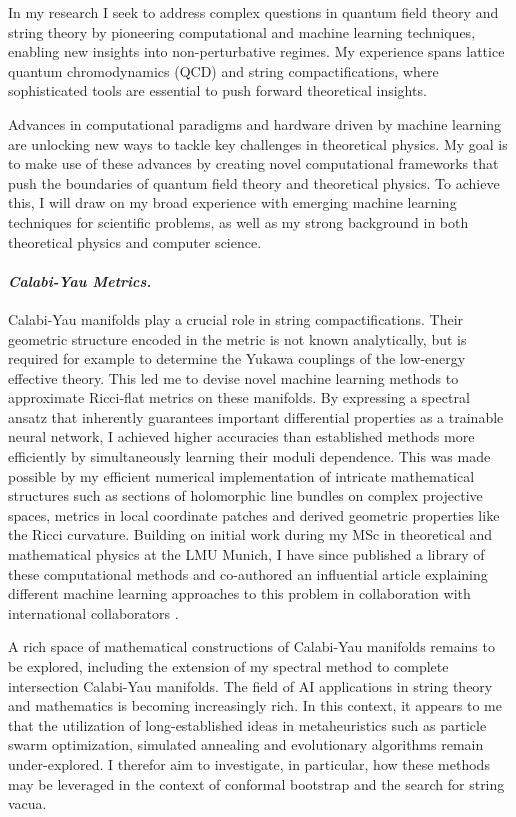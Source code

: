 \documentclass[11pt]{article}
\title{}
\author{}
\date{}
\begin{document}
\thispagestyle{firstpagestyle}


In my research I seek to address complex questions in quantum field theory and string theory by pioneering computational and machine learning techniques, enabling new insights into non-perturbative regimes.
My experience spans lattice quantum chromodynamics (QCD) and string compactifications, where sophisticated tools are essential to push forward theoretical insights.

Advances in computational paradigms and hardware driven by machine learning are unlocking new
ways to tackle key challenges in theoretical physics. My goal is to make use of these advances by creating novel computational
frameworks that push the boundaries of quantum field theory and theoretical physics. To achieve
this, I will draw on my broad experience with emerging machine learning techniques for scientific
problems, as well as my strong background in both theoretical physics and computer science.


\paragraph{\textit{{Calabi-Yau Metrics.}}}
Calabi-Yau manifolds play a crucial role in string compactifications.
Their geometric structure encoded in the metric is not known analytically, but is required for example to determine the Yukawa couplings of the low-energy effective theory.
This led me to devise novel machine learning methods to approximate Ricci-flat metrics on these manifolds.
By expressing a spectral ansatz that inherently guarantees important differential properties as a trainable neural network, I achieved higher accuracies than established methods more efficiently by simultaneously learning their moduli dependence.
This was made possible by my efficient numerical implementation of intricate mathematical structures such as sections of holomorphic line bundles on complex projective spaces, metrics in local coordinate patches and derived geometric properties like the Ricci curvature.
Building on initial work during my MSc in theoretical and mathematical physics at the LMU Munich, I have since published a library of these computational methods \cite{gerdes2023CYJAXPackage} and co-authored an influential article explaining different machine learning approaches to this problem in collaboration with international collaborators \cite{anderson2021ModulidependentCalabiYau}.

\textbf{\color{royalblue}{Future Directions.}}
A rich space of mathematical constructions of Calabi-Yau manifolds remains to be explored, including the extension of my spectral method to complete intersection Calabi-Yau manifolds.
The field of AI applications in string theory and mathematics is becoming increasingly rich.
In this context, it appears to me that the utilization of long-established ideas in metaheuristics such as particle swarm optimization, simulated annealing and evolutionary algorithms remain under-explored.
I therefor aim to investigate, in particular, how these methods may be leveraged in the context of conformal bootstrap and the search for string vacua.
\end{document}
